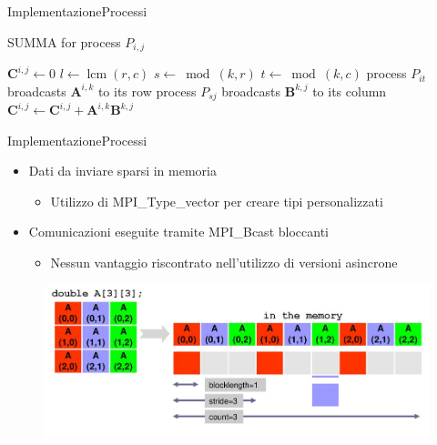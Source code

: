 \documentclass{beamer}
\DeclareMathOperator{\lcm}{lcm}
\begin{document}
\begin{frame}{Implementazione}{Processi}
    \begin{algorithm}[H]
        \caption{SUMMA for process $P_{i,j}$}
        \begin{algorithmic}
            \State $\mathbf{C}^{i,j} \gets 0$
            \State $l \gets \lcm(r,c)$
            \State $s \gets \bmod(k, r)$
            \State $t \gets \bmod(k, c)$
            \State process $P_{it}$ broadcasts $\mathbf{A}^{i,k}$ to its row
            \State process $P_{sj}$ broadcasts $\mathbf{B}^{k,j}$ to its column
            \State $\mathbf{C}^{i,j} \gets \mathbf{C}^{i,j} + \mathbf{A}^{i,k}\mathbf{B}^{k,j}$
            \EndFor
        \end{algorithmic}
    \end{algorithm}
\end{frame}

\begin{frame}{Implementazione}{Processi}
    \begin{itemize}
        \item Dati da inviare sparsi in memoria
              \begin{itemize}
                  \item Utilizzo di MPI\_Type\_vector per creare tipi personalizzati
              \end{itemize}
        \item Comunicazioni eseguite tramite MPI\_Bcast bloccanti
              \begin{itemize}
                  \item Nessun vantaggio riscontrato nell'utilizzo di versioni asincrone
              \end{itemize}
    \end{itemize}

    \begin{figure}[h]
        \includegraphics[width=0.7\linewidth]{imgs/mpi_type_vector.png}
    \end{figure}
\end{frame}
\end{document}
